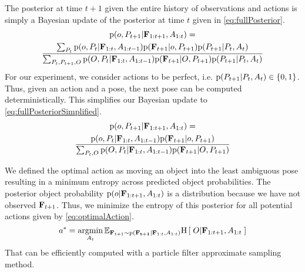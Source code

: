 

        
        The posterior at time $t+1$ given the entire history of observations and actions is simply a Bayesian update of the posterior at time $t$ given in \eqref{eq:fullPosterior}.
        \begin{multline}
            \label{eq:fullPosterior}
            \prob{o,P_{t+1}|\set{F}_{1:t+1},A_{1:t}} = \\ \frac{ \sum_{P_t} \prob{o,P_t|\set{F}_{1:t},A_{1:t-1}} \prob{\set{F}_{t+1}|o,P_{t+1}} \prob{P_{t+1}|P_t,A_t}}{\sum_{P_t,P_{t+1},O} \prob{O,P_t|\set{F}_{1:t},A_{1:t-1}} \prob{\set{F}_{t+1}|O,P_{t+1}} \prob{P_{t+1}|P_t,A_t}}
        \end{multline}
        For our experiment, we consider actions to be perfect, i.e. $\text{p}(P_{t+1}|P_t,A_t) \in \{ 0 , 1 \}$. Thus, given an action and a pose, the next pose can be computed deterministically. This simplifies our Bayesian update to \eqref{eq:fullPosteriorSimplified}.
        \begin{multline}
            \label{eq:fullPosteriorSimplified}
            \prob{o,P_{t+1}|\set{F}_{1:t+1},A_{1:t}} = \\ \frac{\prob{o,P_t|\set{F}_{1:t},A_{1:t-1}} \prob{\set{F}_{t+1}|o,P_{t+1}} }{\sum_{P_t,O} \prob{O,P_t|\set{F}_{1:t},A_{1:t-1}} \prob{\set{F}_{t+1}|O,P_{t+1}} }
        \end{multline}
        
        We defined the optimal action as moving an object into the least ambiguous pose resulting in a minimum entropy across predicted object probabilities. The posterior object probability $\text{p}(o|\mathbf{F}_{1:t+1},A_{1:t})$ is a distribution because we have not observed $\mathbf{F}_{t+1}$. Thus, we minimize the  entropy of this posterior for all potential actions given by \eqref{eq:optimalAction}.
        \begin{equation}
            \label{eq:optimalAction}
            a^* = \argmin_{A_t} \expectedValue{ \entropy{O|\set{F}_{1:t+1},A_{1:t}} }{\set{F}_{t+1} \sim \prob{\set{F_{t+1}}|\set{F}_{1:t},A_{1:t}}}
        \end{equation}
        That can be efficiently computed with a particle filter approximate sampling method.

